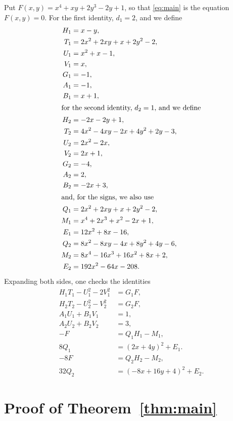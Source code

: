 \documentclass[11pt]{article}
\begin{document}
Put $F(x,y)=x^{4}+xy+2y^{3}-2y+1$, so that \eqref{eq:main} is the equation $F(x,y)=0$.
For the first identity, $d_{1}=2$, and we define
\begin{align*}
H_{1}&=x-y,\\
T_{1}&=2x^{2}+2xy+x+2y^{2}-2,\\
U_{1}&=x^{2}+x-1,\\
V_{1}&=x,\\
G_{1}&=-1,\\
A_{1}&=-1,\\
B_{1}&=x+1,\\
\intertext{for the second identity, $d_{2}=1$, and we define}
H_{2}&=-2x-2y+1,\\
T_{2}&=4x^{2}-4xy-2x+4y^{2}+2y-3,\\
U_{2}&=2x^{2}-2x,\\
V_{2}&=2x+1,\\
G_{2}&=-4,\\
A_{2}&=2,\\
B_{2}&=-2x+3,\\
\intertext{and, for the signs, we also use}
Q_{1}&=2x^{2}+2xy+x+2y^{2}-2,\\
M_{1}&=x^{4}+2x^{3}+x^{2}-2x+1,\\
E_{1}&=12x^{2}+8x-16,\\
Q_{2}&=8x^{2}-8xy-4x+8y^{2}+4y-6,\\
M_{2}&=8x^{4}-16x^{3}+16x^{2}+8x+2,\\
E_{2}&=192x^{2}-64x-208.
\end{align*}
Expanding both sides, one checks the identities
\begin{align}
H_{1}T_{1}-U_{1}^2-2V_{1}^2&=G_{1}F,\label{eq:norm1}\\
H_{2}T_{2}-U_{2}^2-V_{2}^2&=G_{2}F,\label{eq:norm2}\\
A_{1}U_{1}+B_{1}V_{1}&=1,\label{eq:bez1}\\
A_{2}U_{2}+B_{2}V_{2}&=3,\label{eq:bez2}\\
-F&=Q_{1}H_{1}-M_{1},\label{eq:sign1}\\
8Q_{1}&=(2x+4y)^2+E_{1}.\label{eq:sign1b}\\
-8F&=Q_{2}H_{2}-M_{2},\label{eq:sign2}\\
32Q_{2}&=(-8x+16y+4)^2+E_{2}.\label{eq:sign2b}
\end{align}

\section{Proof of Theorem~\ref{thm:main}}
\end{document}
